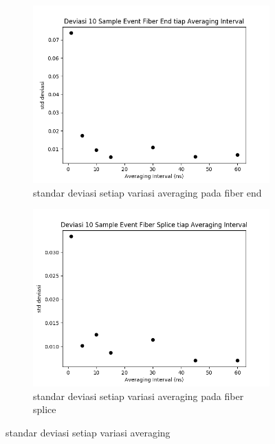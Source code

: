 \documentclass[12pt]{article}
\begin{document}
	\begin{figure}[!h]
		\centering
		\captionsetup{justification=centering}
		\begin{subfigure}[b]{0.7\textwidth}
			\includegraphics[width=\textwidth]{images/Bab_4/stddev_avg_end}	
			\caption{\small{standar deviasi setiap variasi averaging pada fiber end}}		
		\end{subfigure}
		\begin{subfigure}[b]{0.7\textwidth}
			\includegraphics[width=\linewidth]{images/Bab_4/stddev_avg_splice}
			\caption{\small{standar deviasi setiap variasi averaging pada fiber splice}}			
		\end{subfigure}
		\caption[belum ada judul]{\small{standar deviasi setiap variasi averaging}}
	\end{figure}
\end{document}
